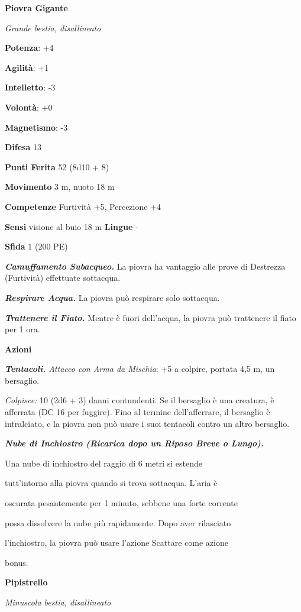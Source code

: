 \begin{multicols}{2}
\textbf{Piovra Gigante}

\emph{Grande bestia, disallineato}

\textbf{Potenza}: +4

\textbf{Agilità}: +1

\textbf{Intelletto}: -3

\textbf{Volontà}: +0

\textbf{Magnetismo}: -3

\textbf{Difesa} 13

\textbf{Punti Ferita} 52 (8d10 + 8)

\textbf{Movimento} 3 m, nuoto 18 m

\textbf{Competenze} Furtività +5, Percezione +4

\textbf{Sensi} visione al buio 18 m
\textbf{Lingue} -

\textbf{Sfida} 1 (200 PE)\smallskip

\emph{\textbf{Camuffamento Subacqueo.}} La piovra ha vantaggio alle
prove di Destrezza (Furtività) effettuate sottacqua.

\emph{\textbf{Respirare Acqua.}} La piovra può respirare solo sottacqua.

\emph{\textbf{Trattenere il Fiato.}} Mentre è fuori dell'acqua, la
piovra può trattenere il fiato per 1 ora.

\smallskip\textbf{Azioni}

\emph{\textbf{Tentacoli.} Attacco con Arma da Mischia}: +5 a colpire,
portata 4,5 m, un bersaglio.

\emph{Colpisce:} 10 (2d6 + 3) danni contundenti. Se il bersaglio è una
creatura, è afferrata (DC 16 per fuggire). Fino al termine
dell'afferrare, il bersaglio è intralciato, e la piovra non può usare i
suoi tentacoli contro un altro bersaglio.

\emph{\textbf{Nube di Inchiostro (Ricarica dopo un Riposo Breve o
Lungo).}}

Una nube di inchiostro del raggio di 6 metri si estende

tutt'intorno alla piovra quando si trova sottacqua. L'aria è

oscurata pesantemente per 1 minuto, sebbene una forte corrente

possa dissolvere la nube più rapidamente. Dopo aver rilasciato

l'inchiostro, la piovra può usare l'azione Scattare come azione

bonus.

\textbf{Pipistrello}

\emph{Minuscola bestia, disallineato}


\end{multicols}
